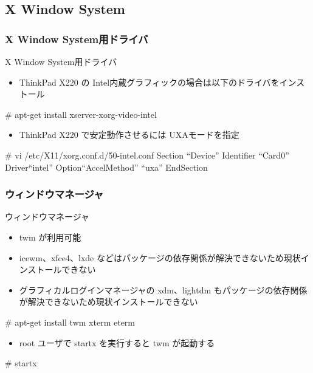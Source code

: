 \subsection{X Window System}
\subsubsection{X Window System用ドライバ}
\begin{frame}[containsverbatim]{X Window System用ドライバ}
  \begin{itemize}
  \item ThinkPad X220 の Intel内蔵グラフィックの場合は以下のドライバをインストール
  \end{itemize}
  
\begin{commandlinesmall}
# apt-get install xserver-xorg-video-intel
\end{commandlinesmall}

  \begin{itemize}
  \item ThinkPad X220 で安定動作させるには UXAモードを指定
  \end{itemize}
  
\begin{commandlinesmall}
# vi /etc/X11/xorg.conf.d/50-intel.conf
Section ``Device''
  Identifier  ``Card0''
  Driver``intel''
  Option``AccelMethod''  ``uxa''
EndSection
\end{commandlinesmall}

\end{frame}


\subsubsection{ウィンドウマネージャ}
\begin{frame}[containsverbatim]{ウィンドウマネージャ}
  \begin{itemize}
  \item twm が利用可能
  \item icewm、xfce4、lxde などはパッケージの依存関係が解決できないため現状インストールできない
  \item グラフィカルログインマネージャの xdm、lightdm もパッケージの依存関係が解決できないため現状インストールできない
  \end{itemize}
  
\begin{commandlinesmall}
# apt-get install twm xterm eterm
\end{commandlinesmall}

  \begin{itemize}
  \item root ユーザで startx を実行すると twm が起動する
  \end{itemize}

\begin{commandlinesmall}
# startx
\end{commandlinesmall}
  
\end{frame}


